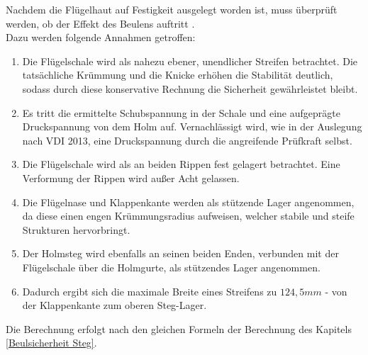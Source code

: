 Nachdem die Flügelhaut auf Festigkeit ausgelegt worden ist, muss überprüft werden, ob der Effekt des Beulens auftritt \cite{item1}.\\

\noindent Dazu werden folgende Annahmen getroffen:

\begin{enumerate}
	\item Die Flügelschale wird als nahezu ebener, unendlicher Streifen betrachtet. Die tatsächliche Krümmung und die Knicke erhöhen die Stabilität deutlich, sodass durch diese konservative Rechnung die Sicherheit gewährleistet bleibt.
	\item Es tritt die ermittelte Schubspannung in der Schale und eine aufgeprägte Druckspannung von dem Holm auf. Vernachlässigt wird, wie in der Auslegung nach  VDI 2013, eine Druckspannung durch die angreifende Prüfkraft selbst.
	\item Die Flügelschale wird als an beiden Rippen fest gelagert betrachtet. Eine Verformung der Rippen wird außer Acht gelassen.
	\item Die Flügelnase und Klappenkante werden als stützende Lager angenommen, da diese einen engen Krümmungsradius aufweisen, welcher stabile und steife Strukturen hervorbringt.
	\item Der Holmsteg wird ebenfalls an seinen beiden Enden, verbunden mit der Flügelschale über die Holmgurte, als stützendes Lager angenommen.
	\item Dadurch ergibt sich die maximale Breite eines Streifens zu $124,5 mm$ - von der Klappenkante zum oberen Steg-Lager.
\end{enumerate}

\noindent Die Berechnung erfolgt nach den gleichen Formeln der Berechnung des Kapitels \ref{Beulsicherheit Steg}. \\

